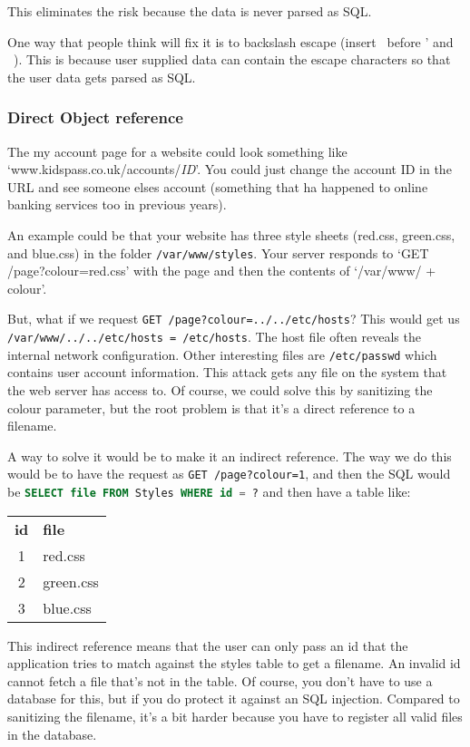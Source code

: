 \documentclass[11pt,a4paper,titlepage,dvipsnames,cmyk]{scrartcl}
\begin{document}
This eliminates the risk because the data is never parsed as SQL.

One way that people think will fix it is to backslash escape (insert \
before ' and \ ). This is because user supplied data can contain the
escape characters so that the user data gets parsed as SQL.

\subsubsection{Direct Object reference}%
\label{ssub:Direct Object reference}

The my account page for a website could look something like
`www.kidspass.co.uk/accounts/\textit{ID}'. You could just change
the account ID in the URL and see someone elses account (something that ha
happened to online banking services too in previous years).

An example could be that your website has three style sheets (red.css,
green.css, and blue.css) in the folder \lstinline|/var/www/styles|. Your server
responds to `GET /page?colour=red.css' with the page and then the contents
of `/var/www/ + colour'.

But, what if we request \lstinline|GET /page?colour=../../etc/hosts|? This would
get us \lstinline|/var/www/../../etc/hosts = /etc/hosts|. The host file
often reveals the internal network configuration. Other interesting files
are \lstinline|/etc/passwd| which contains user account information. This
attack gets any file on the system that the web server has access to. Of
course, we could solve this by sanitizing the colour parameter, but the
root problem is that it's a direct reference to a filename. 

A way to solve it would be to make it an indirect reference. The way we do
this would be to have the request as \lstinline|GET /page?colour=1|, and
then the SQL would be \lstinline[language=SQL]|SELECT file FROM Styles WHERE id = ?| and then have a table like:

\begin{center}
    \begin{tabular}{c|l}
        \textbf{id} & \textbf{file} \\ \hhline{=|=}
        1 & red.css \\
        2 & green.css \\
        3 & blue.css
    \end{tabular}
\end{center}

This indirect reference means that the user can only pass an id that the
application tries to match against the styles table to get a filename. An
invalid id cannot fetch a file that's not in the table. Of course, you
don't have to use a database for this, but if you do protect it against an
SQL injection. Compared to sanitizing the filename, it's a bit harder
because you have to register all valid files in the database.
\end{document}
